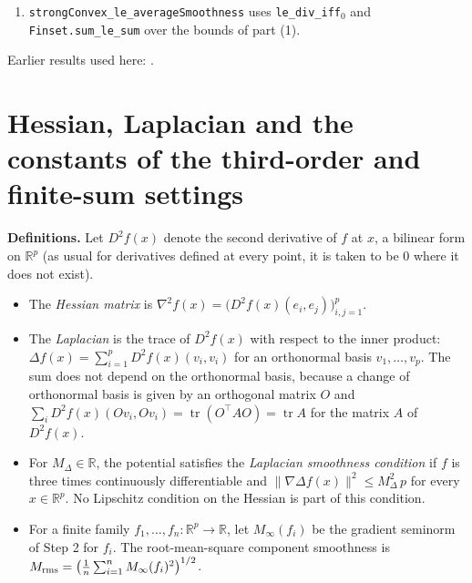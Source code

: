 \documentclass[11pt,a4paper]{article}
\begin{document}
\begin{leanbox}
\begin{enumerate}
\item \texttt{strong\allowbreak{}Convex\_\allowbreak{}le\_\allowbreak{}average\allowbreak{}Smoothness} uses \texttt{le\_\allowbreak{}div\_\allowbreak{}iff\ensuremath{{}_{0}}} and \texttt{Finset.\allowbreak{}sum\_\allowbreak{}le\_\allowbreak{}sum} over the bounds of part (1).

\end{enumerate}
\end{leanbox}


Earlier results used here: \cite[Section~3.2.2]{LangevinLean2026ULASC}.

\section{\texorpdfstring{Hessian, Laplacian and the constants of the third-order and finite-sum settings}{Hessian, Laplacian and the constants of the third-order and finite-sum settings}}


\textbf{Definitions.} Let \(D^2f(x)\) denote the second derivative of \(f\) at \(x\), a bilinear form on \(\mathbb R^p\) (as usual for derivatives defined at every point, it is taken to be \(0\) where it does not exist).



\begin{itemize}


\item The \emph{Hessian matrix} is \(\nabla^2f(x)=\bigl(D^2f(x)(e_i,e_j)\bigr)_{i,j=1}^p\).

\item The \emph{Laplacian} is the trace of \(D^2f(x)\) with respect to the inner product: \(\Delta f(x)=\sum_{i=1}^pD^2f(x)(v_i,v_i)\) for an orthonormal basis \(v_1,\dots,v_p\). The sum does not depend on the orthonormal basis, because a change of orthonormal basis is given by an orthogonal matrix \(O\) and \(\sum_iD^2f(x)(Ov_i,Ov_i)=\operatorname{tr}(O^\top AO)=\operatorname{tr}A\) for the matrix \(A\) of \(D^2f(x)\).

\item For \(M_\Delta\in\mathbb R\), the potential satisfies the \emph{Laplacian smoothness condition} if \(f\) is three times continuously differentiable and \(\|\nabla\Delta f(x)\|^2\le M_\Delta^2\,p\) for every \(x\in\mathbb R^p\). No Lipschitz condition on the Hessian is part of this condition.

\item For a finite family \(f_1,\dots,f_n:\mathbb R^p\to\mathbb R\), let \(M_\infty(f_i)\) be the gradient seminorm of Step 2 for \(f_i\). The root-mean-square component smoothness is \(M_{\rm rms}=\bigl(\frac1n\sum_{i=1}^nM_\infty(f_i)^2\bigr)^{1/2}\).

\end{itemize}
\end{document}
